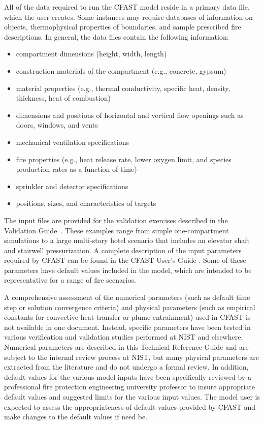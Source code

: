 All of the data required to run the CFAST model reside in a primary data file, which the user creates.  Some instances may require databases of information on objects, thermophysical properties of boundaries, and sample prescribed fire descriptions.  In general, the data files contain the following information:
\begin{itemize}
\item compartment dimensions (height, width, length)
\item construction materials of the compartment (e.g., concrete, gypsum)
\item material properties (e.g., thermal conductivity, specific heat, density, thickness, heat of combustion)
\item dimensions and positions of horizontal and vertical flow openings such as doors, windows, and vents
\item mechanical ventilation specifications
\item fire properties (e.g., heat release rate, lower oxygen limit, and species production rates as a function of time)
\item sprinkler and detector specifications
\item positions, sizes, and characteristics of targets
\end{itemize}
The input files are provided for the validation exercises described in the Validation Guide~\cite{CFAST_Valid_Guide_6}. These examples range from simple one-compartment simulations to a large multi-story hotel scenario that includes an elevator shaft and stairwell pressurization. A complete description of the input parameters required by CFAST can be found in the CFAST User's Guide \cite{CFAST_Users_Guide_6}. Some of these parameters have default values included in the model, which are intended to be representative for a range of fire scenarios.

A comprehensive assessment of the numerical parameters (such as default time step or solution convergence criteria) and physical parameters (such as empirical constants for convective heat transfer or plume entrainment) used in CFAST is not available in one document. Instead, specific parameters have been tested in various verification and validation studies performed at NIST and elsewhere. Numerical parameters are described in this Technical Reference Guide and are subject to the internal review process at NIST, but many physical parameters are extracted from the literature and do not undergo a formal review. In addition, default values for the various model inputs have been specifically reviewed by a professional fire protection engineering university professor to insure appropriate default values and suggested limits for the various input values. The model user is expected to assess the appropriateness of default values provided by CFAST and make changes to the default values if need be.




